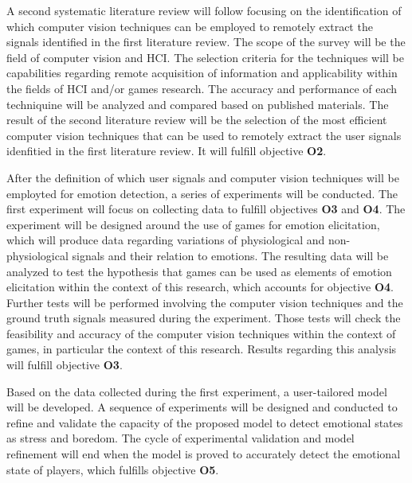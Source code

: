 A second systematic literature review will follow focusing on the identification of which computer vision techniques can be employed to remotely extract the signals identified in the first literature review. The scope of the survey will be the field of computer vision and HCI. The selection criteria for the techniques will be capabilities regarding remote acquisition of information and applicability within the fields of HCI and/or games research. The accuracy and performance of each techniquine will be analyzed and compared based on published materials. The result of the second literature review will be the selection of the most efficient computer vision techniques that can be used to remotely extract the user signals idenfitied in the first literature review. It will fulfill objective \textbf{O2}.

After the definition of which user signals and computer vision techniques will be employted for emotion detection, a series of experiments will be conducted. The first experiment will focus on collecting data to fulfill objectives \textbf{O3} and \textbf{O4}. The experiment will be designed around the use of games for emotion elicitation, which will produce data regarding variations of physiological and non-physiological signals and their relation to emotions. The resulting data will be analyzed to test the hypothesis that games can be used as elements of emotion elicitation within the context of this research, which accounts for objective \textbf{O4}. Further tests will be performed involving the computer vision techniques and the ground truth signals measured during the experiment. Those tests will check the feasibility and accuracy of the computer vision techniques within the context of games, in particular the context of this research. Results regarding this analysis will fulfill objective \textbf{O3}.

Based on the data collected during the first experiment, a user-tailored model will be developed. A sequence of experiments will be designed and conducted to refine and validate the capacity of the proposed model to detect emotional states as stress and boredom. The cycle of experimental validation and model refinement will end when the model is proved to accurately detect the emotional state of players, which fulfills objective \textbf{O5}.

